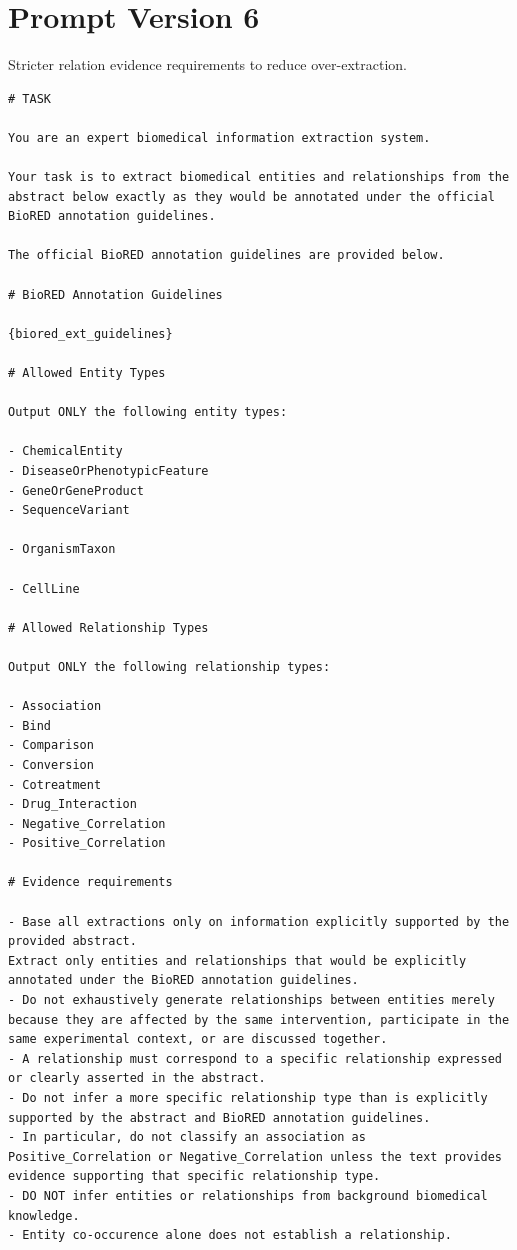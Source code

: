 \section{Prompt Version 6}
Stricter relation evidence requirements to reduce over-extraction.
\begin{lstlisting}
# TASK

You are an expert biomedical information extraction system.

Your task is to extract biomedical entities and relationships from the abstract below exactly as they would be annotated under the official BioRED annotation guidelines.

The official BioRED annotation guidelines are provided below.

# BioRED Annotation Guidelines

{biored_ext_guidelines}

# Allowed Entity Types

Output ONLY the following entity types:

- ChemicalEntity
- DiseaseOrPhenotypicFeature
- GeneOrGeneProduct
- SequenceVariant

- OrganismTaxon

- CellLine

# Allowed Relationship Types

Output ONLY the following relationship types:

- Association
- Bind
- Comparison
- Conversion
- Cotreatment
- Drug_Interaction
- Negative_Correlation
- Positive_Correlation

# Evidence requirements

- Base all extractions only on information explicitly supported by the provided abstract.
Extract only entities and relationships that would be explicitly annotated under the BioRED annotation guidelines.
- Do not exhaustively generate relationships between entities merely because they are affected by the same intervention, participate in the same experimental context, or are discussed together.
- A relationship must correspond to a specific relationship expressed or clearly asserted in the abstract.
- Do not infer a more specific relationship type than is explicitly supported by the abstract and BioRED annotation guidelines.
- In particular, do not classify an association as Positive_Correlation or Negative_Correlation unless the text provides evidence supporting that specific relationship type.
- DO NOT infer entities or relationships from background biomedical knowledge.
- Entity co-occurence alone does not establish a relationship.


\end{lstlisting}
